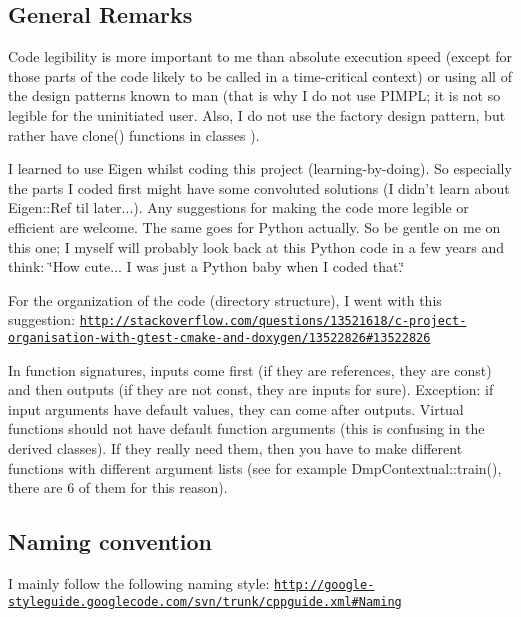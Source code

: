 \hypertarget{page_design_sec_remarks}{}\subsection{General Remarks}\label{page_design_sec_remarks}
\begin{DoxyItemize}
\item Code legibility is more important to me than absolute execution speed (except for those parts of the code likely to be called in a time-\/critical context) or using all of the design patterns known to man (that is why I do not use P\+I\+M\+P\+L; it is not so legible for the uninitiated user. Also, I do not use the factory design pattern, but rather have clone() functions in classes ).\end{DoxyItemize}
\begin{DoxyItemize}
\item I learned to use Eigen whilst coding this project (learning-\/by-\/doing). So especially the parts I coded first might have some convoluted solutions (I didn't learn about Eigen\+::\+Ref til later...). Any suggestions for making the code more legible or efficient are welcome. The same goes for Python actually. So be gentle on me on this one; I myself will probably look back at this Python code in a few years and think\+: \char`\"{}\+How cute... I was just a Python baby when I coded that.\char`\"{}\end{DoxyItemize}
\begin{DoxyItemize}
\item For the organization of the code (directory structure), I went with this suggestion\+: \href{http://stackoverflow.com/questions/13521618/c-project-organisation-with-gtest-cmake-and-doxygen/13522826#13522826}{\tt http\+://stackoverflow.\+com/questions/13521618/c-\/project-\/organisation-\/with-\/gtest-\/cmake-\/and-\/doxygen/13522826\#13522826}\end{DoxyItemize}
\begin{DoxyItemize}
\item In function signatures, inputs come first (if they are references, they are const) and then outputs (if they are not const, they are inputs for sure). Exception\+: if input arguments have default values, they can come after outputs. Virtual functions should not have default function arguments (this is confusing in the derived classes). If they really need them, then you have to make different functions with different argument lists (see for example Dmp\+Contextual\+::train(), there are 6 of them for this reason).\end{DoxyItemize}
\hypertarget{page_design_sec_naming}{}\subsection{Naming convention}\label{page_design_sec_naming}
I mainly follow the following naming style\+: \href{http://google-styleguide.googlecode.com/svn/trunk/cppguide.xml#Naming}{\tt http\+://google-\/styleguide.\+googlecode.\+com/svn/trunk/cppguide.\+xml\#\+Naming}

